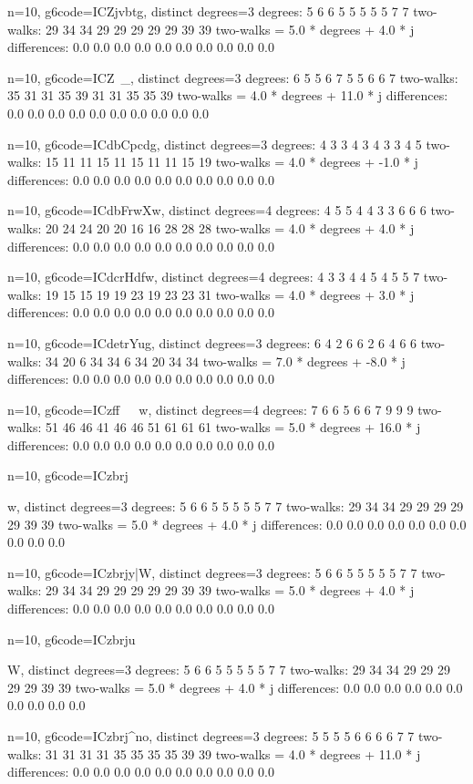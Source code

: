 {{{{{{{{{{{{n=10, g6code=ICZjvbt}g, distinct degrees=3
degrees: 5 6 6 5 5 5 5 5 7 7 
two-walks: 29 34 34 29 29 29 29 29 39 39 
two-walks = 5.0 * degrees + 4.0 * j
differences: 0.0 0.0 0.0 0.0 0.0 0.0 0.0 0.0 0.0 0.0 

n=10, g6code=ICZ\vrx~_, distinct degrees=3
degrees: 6 5 5 6 7 5 5 6 6 7 
two-walks: 35 31 31 35 39 31 31 35 35 39 
two-walks = 4.0 * degrees + 11.0 * j
differences: 0.0 0.0 0.0 0.0 0.0 0.0 0.0 0.0 0.0 0.0 

n=10, g6code=ICdbCpcdg, distinct degrees=3
degrees: 4 3 3 4 3 4 3 3 4 5 
two-walks: 15 11 11 15 11 15 11 11 15 19 
two-walks = 4.0 * degrees + -1.0 * j
differences: 0.0 0.0 0.0 0.0 0.0 0.0 0.0 0.0 0.0 0.0 

n=10, g6code=ICdbFrwXw, distinct degrees=4
degrees: 4 5 5 4 4 3 3 6 6 6 
two-walks: 20 24 24 20 20 16 16 28 28 28 
two-walks = 4.0 * degrees + 4.0 * j
differences: 0.0 0.0 0.0 0.0 0.0 0.0 0.0 0.0 0.0 0.0 

n=10, g6code=ICdcrHdfw, distinct degrees=4
degrees: 4 3 3 4 4 5 4 5 5 7 
two-walks: 19 15 15 19 19 23 19 23 23 31 
two-walks = 4.0 * degrees + 3.0 * j
differences: 0.0 0.0 0.0 0.0 0.0 0.0 0.0 0.0 0.0 0.0 

n=10, g6code=ICdetrYug, distinct degrees=3
degrees: 6 4 2 6 6 2 6 4 6 6 
two-walks: 34 20 6 34 34 6 34 20 34 34 
two-walks = 7.0 * degrees + -8.0 * j
differences: 0.0 0.0 0.0 0.0 0.0 0.0 0.0 0.0 0.0 0.0 

n=10, g6code=ICzff~~~w, distinct degrees=4
degrees: 7 6 6 5 6 6 7 9 9 9 
two-walks: 51 46 46 41 46 46 51 61 61 61 
two-walks = 5.0 * degrees + 16.0 * j
differences: 0.0 0.0 0.0 0.0 0.0 0.0 0.0 0.0 0.0 0.0 

n=10, g6code=ICzbrj{{w, distinct degrees=3
degrees: 5 6 6 5 5 5 5 5 7 7 
two-walks: 29 34 34 29 29 29 29 29 39 39 
two-walks = 5.0 * degrees + 4.0 * j
differences: 0.0 0.0 0.0 0.0 0.0 0.0 0.0 0.0 0.0 0.0 

n=10, g6code=ICzbrjy|W, distinct degrees=3
degrees: 5 6 6 5 5 5 5 5 7 7 
two-walks: 29 34 34 29 29 29 29 29 39 39 
two-walks = 5.0 * degrees + 4.0 * j
differences: 0.0 0.0 0.0 0.0 0.0 0.0 0.0 0.0 0.0 0.0 

n=10, g6code=ICzbrju}W, distinct degrees=3
degrees: 5 6 6 5 5 5 5 5 7 7 
two-walks: 29 34 34 29 29 29 29 29 39 39 
two-walks = 5.0 * degrees + 4.0 * j
differences: 0.0 0.0 0.0 0.0 0.0 0.0 0.0 0.0 0.0 0.0 

n=10, g6code=ICzbrj^no, distinct degrees=3
degrees: 5 5 5 5 6 6 6 6 7 7 
two-walks: 31 31 31 31 35 35 35 35 39 39 
two-walks = 4.0 * degrees + 11.0 * j
differences: 0.0 0.0 0.0 0.0 0.0 0.0 0.0 0.0 0.0 0.0 

}}}}}}}}}}}}
